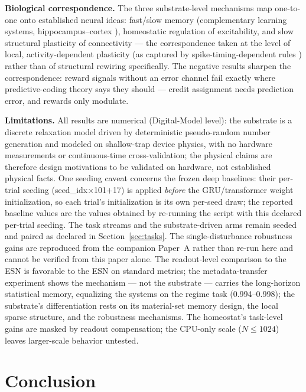 \documentclass[11pt]{article}
\begin{document}
\textbf{Biological correspondence.} The three substrate-level mechanisms map
one-to-one onto established neural ideas: fast/slow memory (complementary
learning systems, hippocampus--cortex \cite{mcclelland1995}), homeostatic
regulation of excitability, and slow structural plasticity of connectivity ---
the correspondence taken at the level of local, activity-dependent plasticity
(as captured by spike-timing-dependent rules \cite{pfister2006}) rather than
of structural rewiring specifically. The
negative results sharpen the correspondence: reward signals without an error
channel fail exactly where predictive-coding theory says they should --- credit
assignment needs prediction error, and rewards only modulate.

\textbf{Limitations.} All results are numerical (Digital-Model level): the
substrate is a discrete relaxation model driven by deterministic
pseudo-random number generation and modeled on shallow-trap device physics,
with no hardware measurements or continuous-time cross-validation; the
physical claims are therefore design motivations to be validated on hardware,
not established physical facts. One seeding caveat concerns the frozen deep
baselines: their per-trial seeding (seed\_idx$\times$101$+$17) is applied
\emph{before} the GRU/transformer weight initialization, so each trial's
initialization is its own per-seed draw; the reported
baseline values are the values obtained by re-running the
script with this declared per-trial seeding. The task streams and the
substrate-driven arms
remain seeded and paired as declared in Section~\ref{sec:tasks}. The
single-disturbance robustness gains are
reproduced from the companion Paper~A rather than re-run here and cannot be
verified from this paper alone. The
readout-level comparison to the ESN is favorable to the ESN on standard
metrics; the metadata-transfer experiment shows the mechanism --- not the
substrate --- carries the long-horizon statistical memory, equalizing the
systems on the regime task (0.994--0.998); the substrate's differentiation
rests on its material-set memory design, the local sparse structure, and the
robustness mechanisms. The homeostat's task-level gains are masked by readout
compensation; the CPU-only scale ($N \le 1024$) leaves larger-scale behavior
untested.

\section{Conclusion}
\label{sec:conclusion}
\end{document}
